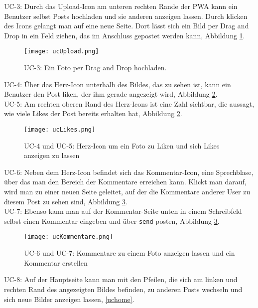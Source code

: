 UC-3: 
Durch das Upload-Icon am unteren rechten Rande der PWA kann ein Benutzer selbst Posts hochladen und sie anderen anzeigen lassen. Durch klicken des Icons gelangt man auf eine neue Seite. Dort lässt sich ein Bild per Drag and Drop in ein Feld ziehen, das im Anschluss gepostet werden kann, Abbildung \ref{uc3}. \\


\begin{figure}[!htb]
    \centering
    \texttt{[image: ucUpload.png]}
    \caption{UC-3: Ein Foto per Drag and Drop hochladen.}
    \label{uc3}
\end{figure}

\newpage

UC-4:
Über das Herz-Icon unterhalb des Bildes, das zu sehen ist, kann ein Benutzer den Post liken, der ihm gerade angezeigt wird, Abbildung \ref{uc4}.\\


UC-5:
Am rechten oberen Rand des Herz-Icons ist eine Zahl sichtbar, die aussagt, wie viele Likes der Post bereits erhalten hat, Abbildung \ref{uc4}.\\

\begin{figure}[!htb]
    \centering
    \texttt{[image: ucLikes.png]}
    \caption{UC-4 und UC-5: Herz-Icon um ein Foto zu Liken und sich Likes anzeigen zu lassen}
    \label{uc4}
\end{figure}

\newpage

UC-6:
Neben dem Herz-Icon befindet sich das Kommentar-Icon, eine Sprechblase, über das man den Bereich der Kommentare erreichen kann. Klickt man darauf, wird man zu einer neuen Seite geleitet, auf der die Kommentare anderer User zu diesem Post zu sehen sind, Abbildung \ref{uc6}. \\

    
UC-7:
Ebenso kann man auf der Kommentar-Seite unten in einem Schreibfeld selbst einen Kommentar eingeben und über \texttt{send} posten, Abbildung \ref{uc6}.

\begin{figure}[!htb]
    \centering
    \texttt{[image: ucKommentare.png]}
    \caption{UC-6 und UC-7: Kommentare zu einem Foto anzeigen lassen und ein Kommentar erstellen}
    \label{uc6}
\end{figure}

\newpage


UC-8:
Auf der Hauptseite kann man mit den Pfeilen, die sich am linken und rechten Rand des angezeigten Bildes befinden, zu anderen Posts wechseln und sich neue Bilder anzeigen lassen, \ref{uchome}.\\

